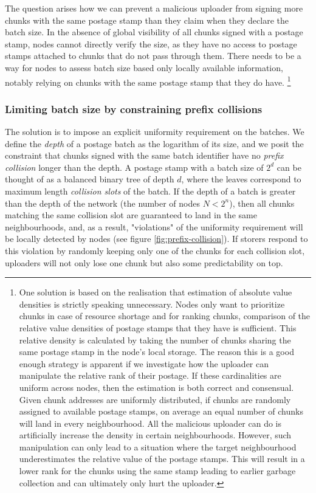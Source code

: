 The question arises how we can prevent a malicious uploader from signing more chunks with the same postage stamp than they claim when they declare the batch size. In the absence of global visibility of all chunks signed with a postage stamp, nodes cannot directly verify the size, as they have no access to postage stamps attached to chunks that do not pass through them. There needs to be a way for nodes to assess batch size based only locally available information, notably relying on chunks with the same postage stamp that they do have.%
%
\footnote{One solution is based on the realisation that estimation of absolute value densities is strictly speaking unnecessary. Nodes only want to prioritize chunks in case of resource shortage and for ranking chunks, comparison of the relative value densities of postage stamps that they have is sufficient.  This relative density is calculated by taking the number of chunks sharing the same postage stamp in the node's local storage. The reason this is a good enough strategy is apparent if we investigate how the uploader can manipulate the relative rank of their postage. If these cardinalities are uniform across nodes, then the estimation is both correct and consensual. Given chunk addresses are uniformly distributed, if chunks are randomly assigned to available postage stamps, on average an equal number of chunks will land in every neighbourhood. All the malicious uploader can do is artificially increase the density in certain neighbourhoods. However, such  manipulation can only lead to a situation where the target neighbourhood underestimates the relative value of the postage stamps. This will result in a lower rank for the chunks using the same stamp leading to earlier garbage collection and can ultimately only  hurt  the uploader.}

\subsubsection{Limiting batch size by constraining prefix collisions}

The solution is to impose an explicit uniformity requirement on the batches. We define the \emph{depth} of a postage batch as the logarithm of its size, and we posit the constraint that chunks signed with the same batch identifier have no \emph{prefix collision} longer than the depth. A postage stamp with a batch size of $2^d$ can be thought of as a balanced binary tree of depth $d$, where the leaves correspond to maximum length \emph{collision slots} of the batch. If the depth of a batch is greater than the depth of the network (the number of nodes $N<2^n$), then all chunks matching the same collision slot are guaranteed to land in the same neighbourhoods, and, as a result, "violations" of the uniformity requirement will be locally detected by nodes (see figure \ref{fig:prefix-collision}). If storers respond to this violation by randomly keeping only one of the chunks for each collision slot, uploaders will not only lose one chunk but also some predictability on top.

